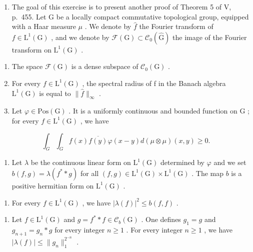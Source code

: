 \begin{enumerate}
\def\labelenumi{\arabic{enumi})}
\setcounter{enumi}{8}
\tightlist
\item
  The goal of this exercise is to present another proof of Theorem 5 of V, p.~455. Let G be a locally compact commutative topological group, equipped with a Haar measure \(\mu\) . We denote by \(\widehat{f}\) the Fourier transform of \(f \in \mathrm{L}^1(\mathrm{G})\) , and we denote by \(\mathcal{F}(\mathrm{G}) \subset \mathcal{C}_0(\widehat{\mathrm{G}})\) the image of the Fourier transform on \(\mathrm{L}^1(\mathrm{G})\) .
\end{enumerate}

\begin{enumerate}
\def\labelenumi{\alph{enumi})}
\item
  The space \(\mathcal{F}(\mathrm{G})\) is a dense subspace of \(\mathcal{C}_0(\mathrm{G})\) .
\item
  For every \(f \in \mathrm{L}^{1}(\mathrm{G})\) , the spectral radius of f in the Banach algebra \(\mathrm{L}^{1}(\mathrm{G})\) is equal to \(\|\widehat{f}\|_{\infty}\) .
\item
  Let \(\varphi\in\mathrm{Pos}(\mathrm{G})\) . It is a uniformly continuous and bounded function on \(\mathrm{G}\) ; for every \(f\in\mathrm{L}^{1}(\mathrm{G})\) , we have
\end{enumerate}

\[
\int_ {G} \int_ {G} f (x) \overline {{f (y)}} \varphi (x - y) d (\mu \otimes \mu) (x, y) \geqslant 0.
\]

\begin{enumerate}
\def\labelenumi{\alph{enumi})}
\setcounter{enumi}{3}
\tightlist
\item
  Let \(\lambda\) be the continuous linear form on \(\mathrm{L}^{1}(\mathrm{G})\) determined by \(\varphi\) and we set \(b(f,g)=\lambda(f^{*}*g)\) for all \((f,g)\in\mathrm{L}^{1}(\mathrm{G})\times\mathrm{L}^{1}(\mathrm{G})\) . The map \(b\) is a positive hermitian form on \(\mathrm{L}^{1}(\mathrm{G})\) .
\end{enumerate}

\begin{enumerate}
\def\labelenumi{\alph{enumi})}
\setcounter{enumi}{4}
\tightlist
\item
  For every \(f \in \mathrm{L}^1(\mathrm{G})\) , we have \(|\lambda(f)|^2 \leqslant b(f, f)\) .
\end{enumerate}

\begin{enumerate}
\def\labelenumi{\alph{enumi})}
\setcounter{enumi}{5}
\tightlist
\item
  Let \(f \in \mathrm{L}^{1}(\mathrm{G})\) and \(g = f^{*} * f \in \mathcal{C}_{b}(\mathrm{G})\) . One defines \(g_{1} = g\) and \(g_{n+1} = g_{n} * g\) for every integer \(n \geqslant 1\) . For every integer \(n \geqslant 1\) , we have \(|\lambda(f)| \leqslant \|g_{n}\|_{1}^{2^{-n}}\) .
\end{enumerate}

